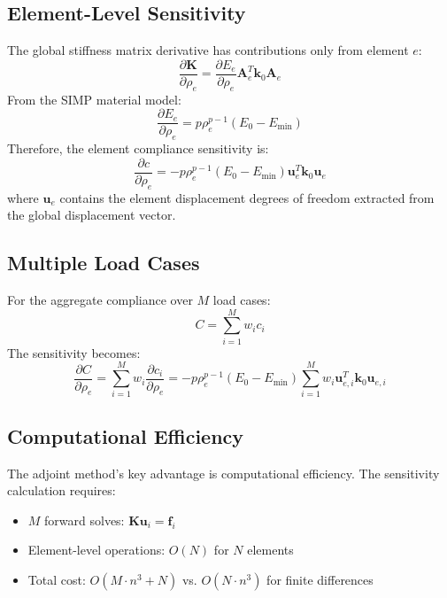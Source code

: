 \documentclass[11pt]{report}
\newcommand{\vect}[1]{\boldsymbol{#1}}
\newcommand{\matr}[1]{\mathbf{#1}}
\newcommand{\rhoe}{\rho_e}
\newcommand{\youngs}{E}
\newcommand{\youngszero}{\youngs_0}
\newcommand{\penalty}{p}
\newcommand{\loadvect}{\vect{f}}
\newcommand{\dispvect}{\vect{u}}
\newcommand{\stiffmat}{\matr{K}}
\newcommand{\elemstiff}{\matr{k}_0}
\newcommand{\compliance}{C}
\begin{document}
\subsection{Element-Level Sensitivity}
The global stiffness matrix derivative has contributions only from element $e$:
\begin{equation}
\frac{\partial \stiffmat}{\partial \rhoe} = \frac{\partial \youngs_e}{\partial \rhoe} \matr{A}_e^T \elemstiff \matr{A}_e
\end{equation}
From the SIMP material model:
\begin{equation}
\frac{\partial \youngs_e}{\partial \rhoe} = \penalty \rhoe^{\penalty-1} (\youngszero - \youngs_{\text{min}})
\end{equation}
Therefore, the element compliance sensitivity is:
\begin{equation}
\frac{\partial c}{\partial \rhoe} = -\penalty \rhoe^{\penalty-1} (\youngszero - \youngs_{\text{min}}) \dispvect_e^T \elemstiff \dispvect_e
\end{equation}
where $\dispvect_e$ contains the element displacement degrees of freedom extracted from the global displacement vector.

\subsection{Multiple Load Cases}
For the aggregate compliance over $M$ load cases:
\begin{equation}
\compliance = \sum_{i=1}^{M} w_i c_i
\end{equation}
The sensitivity becomes:
\begin{equation}
\frac{\partial \compliance}{\partial \rhoe} = \sum_{i=1}^{M} w_i \frac{\partial c_i}{\partial \rhoe} = -\penalty \rhoe^{\penalty-1} (\youngszero - \youngs_{\text{min}}) \sum_{i=1}^{M} w_i \dispvect_{e,i}^T \elemstiff \dispvect_{e,i}
\end{equation}

\subsection{Computational Efficiency}
The adjoint method's key advantage is computational efficiency. The sensitivity calculation requires:
\begin{itemize}
    \item $M$ forward solves: $\stiffmat \dispvect_i = \loadvect_i$
    \item Element-level operations: $O(N)$ for $N$ elements
    \item Total cost: $O(M \cdot n^3 + N)$ vs. $O(N \cdot n^3)$ for finite differences
\end{itemize}
\end{document}
